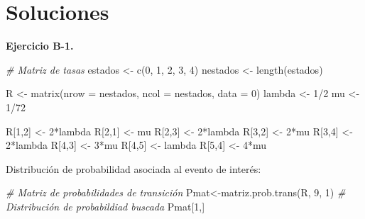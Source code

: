 \documentclass[
]{book}
\newenvironment{Shaded}{\begin{snugshade}}{\end{snugshade}}
\newcommand{\AttributeTok}[1]{\textcolor[rgb]{0.77,0.63,0.00}{#1}}
\newcommand{\CommentTok}[1]{\textcolor[rgb]{0.56,0.35,0.01}{\textit{#1}}}
\newcommand{\DecValTok}[1]{\textcolor[rgb]{0.00,0.00,0.81}{#1}}
\newcommand{\FunctionTok}[1]{\textcolor[rgb]{0.00,0.00,0.00}{#1}}
\newcommand{\NormalTok}[1]{#1}
\newcommand{\OtherTok}[1]{\textcolor[rgb]{0.56,0.35,0.01}{#1}}
\newcommand{\SpecialCharTok}[1]{\textcolor[rgb]{0.00,0.00,0.00}{#1}}
\theoremstyle{definition}
\theoremstyle{definition}
\theoremstyle{definition}
\theoremstyle{definition}
\theoremstyle{remark}
\begin{document}
\hypertarget{CMTCL}{%
\section{Soluciones}\label{CMTCL}}

\textbf{Ejercicio B-1.}

\begin{Shaded}
\begin{Highlighting}[]
\CommentTok{\# Matriz de tasas}
\NormalTok{estados }\OtherTok{\textless{}{-}} \FunctionTok{c}\NormalTok{(}\DecValTok{0}\NormalTok{, }\DecValTok{1}\NormalTok{, }\DecValTok{2}\NormalTok{, }\DecValTok{3}\NormalTok{, }\DecValTok{4}\NormalTok{)}
\NormalTok{nestados }\OtherTok{\textless{}{-}} \FunctionTok{length}\NormalTok{(estados)}

\NormalTok{R }\OtherTok{\textless{}{-}} \FunctionTok{matrix}\NormalTok{(}\AttributeTok{nrow =}\NormalTok{ nestados, }\AttributeTok{ncol =}\NormalTok{ nestados, }\AttributeTok{data =} \DecValTok{0}\NormalTok{)}
\NormalTok{lambda }\OtherTok{\textless{}{-}} \DecValTok{1}\SpecialCharTok{/}\DecValTok{2}
\NormalTok{mu }\OtherTok{\textless{}{-}} \DecValTok{1}\SpecialCharTok{/}\DecValTok{72} 

\NormalTok{R[}\DecValTok{1}\NormalTok{,}\DecValTok{2}\NormalTok{] }\OtherTok{\textless{}{-}} \DecValTok{2}\SpecialCharTok{*}\NormalTok{lambda }
\NormalTok{R[}\DecValTok{2}\NormalTok{,}\DecValTok{1}\NormalTok{] }\OtherTok{\textless{}{-}}\NormalTok{ mu }
\NormalTok{R[}\DecValTok{2}\NormalTok{,}\DecValTok{3}\NormalTok{] }\OtherTok{\textless{}{-}} \DecValTok{2}\SpecialCharTok{*}\NormalTok{lambda }
\NormalTok{R[}\DecValTok{3}\NormalTok{,}\DecValTok{2}\NormalTok{] }\OtherTok{\textless{}{-}} \DecValTok{2}\SpecialCharTok{*}\NormalTok{mu }
\NormalTok{R[}\DecValTok{3}\NormalTok{,}\DecValTok{4}\NormalTok{] }\OtherTok{\textless{}{-}} \DecValTok{2}\SpecialCharTok{*}\NormalTok{lambda }
\NormalTok{R[}\DecValTok{4}\NormalTok{,}\DecValTok{3}\NormalTok{] }\OtherTok{\textless{}{-}} \DecValTok{3}\SpecialCharTok{*}\NormalTok{mu }
\NormalTok{R[}\DecValTok{4}\NormalTok{,}\DecValTok{5}\NormalTok{] }\OtherTok{\textless{}{-}}\NormalTok{ lambda}
\NormalTok{R[}\DecValTok{5}\NormalTok{,}\DecValTok{4}\NormalTok{] }\OtherTok{\textless{}{-}} \DecValTok{4}\SpecialCharTok{*}\NormalTok{mu}
\end{Highlighting}
\end{Shaded}

Distribución de probabilidad asociada al evento de interés:

\begin{Shaded}
\begin{Highlighting}[]
\CommentTok{\# Matriz de probabilidades de transición}
\NormalTok{Pmat}\OtherTok{\textless{}{-}}\FunctionTok{matriz.prob.trans}\NormalTok{(R, }\DecValTok{9}\NormalTok{, }\DecValTok{1}\NormalTok{)}
\CommentTok{\# Distribución de probabildiad buscada}
\NormalTok{Pmat[}\DecValTok{1}\NormalTok{,]}
\end{Highlighting}
\end{Shaded}
\end{document}
